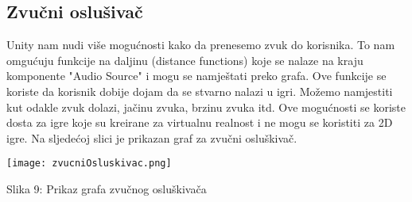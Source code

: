 \subsection{Zvučni oslušivač}
Unity nam nudi više mogućnosti kako da prenesemo zvuk do korisnika. To nam omgućuju funkcije na daljinu (distance functions) koje se nalaze na kraju komponente "Audio Source" i mogu se namještati preko grafa. Ove funkcije se koriste da korisnik dobije dojam da se stvarno nalazi u igri. Možemo namjestiti kut odakle zvuk dolazi, jačinu zvuka, brzinu zvuka itd. Ove mogućnosti se koriste dosta za igre koje su kreirane za virtualnu realnost i ne mogu se koristiti za 2D igre.
\newline
Na sljedećoj slici je prikazan graf za zvučni osluškivač.

\begin{center}
	\texttt{[image: zvucniOsluskivac.png]}
	
	
	Slika 9: Prikaz grafa zvučnog osluškivača
\end{center}


